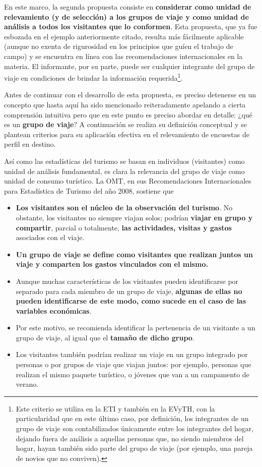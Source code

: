 \documentclass[
]{book}
\begin{document}
En este marco, la segunda propuesta consiste en \textbf{considerar como unidad de relevamiento (y de selección) a los grupos de viaje y como unidad de análisis a todos los visitantes que lo conformen}. Esta propuesta, que ya fue esbozada en el ejemplo anteriormente citado, resulta más fácilmente aplicable (aunque no exenta de rigurosidad en los principios que guíen el trabajo de campo) y se encuentra en línea con las recomendaciones internacionales en la materia. El informante, por su parte, puede ser cualquier integrante del grupo de viaje en condiciones de brindar la información requerida\footnote{Este criterio se utiliza en la ETI y también en la EVyTH, con la particularidad que en este último caso, por definición, los integrantes de un grupo de viaje son contabilizados únicamente entre los integrantes del hogar, dejando fuera de análisis a aquellas personas que, no siendo miembros del hogar, hayan también sido parte del grupo de viaje (por ejemplo, una pareja de novios que no conviven).}.

Antes de continuar con el desarrollo de esta propuesta, es preciso detenerse en un concepto que hasta aquí ha sido mencionado reiteradamente apelando a cierta comprensión intuitiva pero que en este punto es preciso abordar en detalle: ¿qué es un \textbf{grupo de viaje}? A continuación se realiza su definición conceptual y se plantean criterios para su aplicación efectiva en el relevamiento de encuestas de perfil en destino.

Así como las estadísticas del turismo se basan en individuos (visitantes) como unidad de análisis fundamental, es clara la relevancia del grupo de viaje como unidad de consumo turístico. La OMT, en sus Recomendaciones Internacionales para Estadística de Turismo del año 2008, sostiene que

\begin{itemize}
\item
  \textbf{Los visitantes son el núcleo de la observación del turismo}. No obstante, los visitantes no siempre viajan solos; podrían \textbf{viajar en grupo y compartir}, parcial o totalmente, \textbf{las actividades, visitas y gastos} asociados con el viaje.
\item
  \textbf{Un grupo de viaje se define como visitantes que realizan juntos un viaje y comparten los gastos vinculados con el mismo.}
\item
  Aunque muchas características de los visitantes pueden identificarse por separado para cada miembro de un grupo de viaje, \textbf{algunas de ellas no pueden identificarse de este modo, como sucede en el caso de las variables económicas}.
\item
  Por este motivo, se recomienda identificar la pertenencia de un visitante a un grupo de viaje, al igual que el \textbf{tamaño de dicho grupo}.
\item
  Los visitantes también podrían realizar un viaje en un grupo integrado por personas o por grupos de viaje que viajan juntos: por ejemplo, personas que realizan el mismo paquete turístico, o jóvenes que van a un campamento de verano.\\
\end{itemize}
\end{document}

